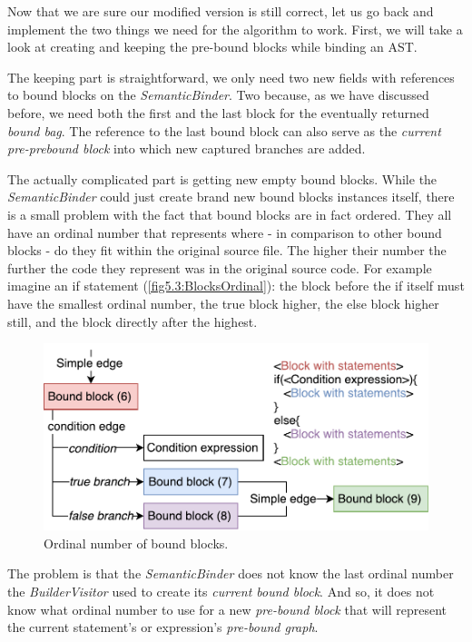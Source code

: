 Now that we are sure our modified version is still correct, let us go back and implement the two things we need for the algorithm to work. First, we will take a look at creating and keeping the pre-bound blocks while binding an AST.

The keeping part is straightforward, we only need two new fields with references to bound blocks on the \emph{SemanticBinder}. Two because, as we have discussed before, we need both the first and the last block for the eventually returned \emph{bound bag}. The reference to the last bound block can also serve as the \emph{current pre-prebound block} into which new captured branches are added.

The actually complicated part is getting new empty bound blocks. While the \emph{SemanticBinder} could just create brand new bound blocks instances itself, there is a small problem with the fact that bound blocks are in fact ordered. They all have an ordinal number that represents where - in comparison to other bound blocks - do they fit within the original source file. The higher their number the further the code they represent was in the original source code. For example imagine an if statement (\autoref{fig5.3:BlocksOrdinal}): the block before the if itself must have the smallest ordinal number, the true block higher, the else block higher still, and the block directly after the highest.

\begin{figure}[H]
	\centering	
	\includegraphics[scale=0.75]{../img/5_3_blockOrdinal}	
	\caption{Ordinal number of bound blocks.}
	\label{fig5.3:BlocksOrdinal}
\end{figure}

The problem is that the \emph{SemanticBinder} does not know the last ordinal number the \emph{BuilderVisitor} used to create its \emph{current bound block}. And so, it does not know what ordinal number to use for a new \emph{pre-bound block} that will represent the current statement’s or expression’s \emph{pre-bound graph}.

